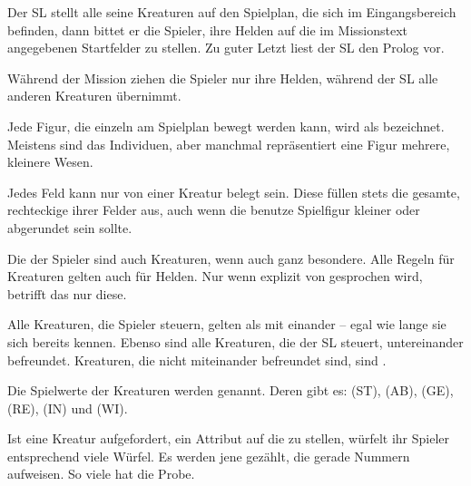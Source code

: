 {		Der SL stellt alle seine Kreaturen auf den Spielplan, die sich im Eingangsbereich befinden, dann bittet er die Spieler, ihre Helden auf die im Missionstext angegebenen Startfelder zu stellen. Zu guter Letzt liest der SL den Prolog vor.

		Während der Mission ziehen die Spieler nur ihre Helden, während der SL alle anderen Kreaturen übernimmt.

		Jede Figur, die einzeln am Spielplan bewegt werden kann, wird als  bezeichnet. Meistens sind das Individuen, aber manchmal repräsentiert eine Figur mehrere, kleinere Wesen.


		\noindent
		Jedes Feld kann nur von einer Kreatur belegt sein. Diese füllen stets die gesamte, rechteckige  ihrer Felder aus, auch wenn die benutze Spielfigur kleiner oder abgerundet sein sollte.

		Die  der Spieler sind auch Kreaturen, wenn auch ganz besondere. Alle Regeln für Kreaturen gelten auch für Helden. Nur wenn explizit von  gesprochen wird, betrifft das nur diese.


		\noindent
		Alle Kreaturen, die Spieler steuern, gelten als mit einander  -- egal wie lange sie sich bereits kennen. Ebenso sind alle Kreaturen, die der SL steuert, untereinander befreundet. Kreaturen, die nicht miteinander befreundet sind, sind .


		Die Spielwerte der Kreaturen werden  genannt. Deren gibt es:  (ST),  (AB),  (GE),  (RE),  (IN) und  (WI).

		Ist eine Kreatur aufgefordert, ein Attribut auf die  zu stellen, würfelt ihr Spieler entsprechend viele Würfel. Es werden jene gezählt, die gerade Nummern aufweisen. So viele  hat die Probe.

}
